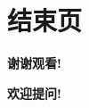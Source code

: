 \documentclass[12pt, aspectratio=169]{beamer}
\begin{document}
\section*{结束页}
\begin{frame}[plain] 

	\begin{center}
		{\Huge \textbf{谢谢观看!}}
		
		\bigskip\bigskip 
		
		{\LARGE \textbf{欢迎提问!}}
	\end{center}
	
\end{frame}

\end{document}
